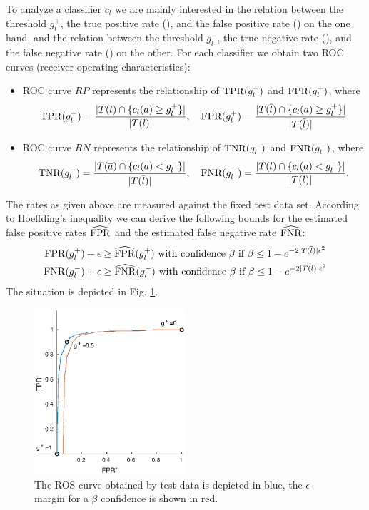 To analyze a classifier $c_l$ we are mainly interested in the relation between the threshold $g_l^+$, the true positive rate (\TPR), and the false positive rate (\FPR) on the one hand, and the relation between the threshold $g_l^-$, 
the true negative rate (\TNR), and the false negative rate (\FNR) on the other.
For each classifier we obtain two ROC curves (receiver operating characteristics):
\begin{itemize}
\item ROC curve $RP$ represents the relationship of $\mathrm{TPR}(g_l^+)$ and $\mathrm{FPR}(g_l^+)$,
where
\begin{gather*}
    \mathrm{TPR}(g_l^+) = \frac{ | T(l) \cap \{ c_l(a) \geq g_l^+ \}|}{|T(l)|},\quad
    \mathrm{FPR}(g_l^+) = \frac{ | T(\overline l) \cap \{ c_l(a) \geq g_l^+ \}|}{|T(\overline l)|}
\end{gather*}
\item ROC curve $RN$ represents the relationship of $\mathrm{TNR}(g_l^-)$ and $\mathrm{FNR}(g_l^-)$, where
\begin{gather*}
    \mathrm{TNR}(g_l^-) = \frac{ | T(\overline a) \cap \{c_l(a) < g_l^- \}|}{|T(\overline l)|},\quad
    \mathrm{FNR}(g_l^-) = \frac{ | T(l) \cap \{c_l(a) < g_l^- \}|}{|T(l)|}.
\end{gather*}
\end{itemize}
The rates as given above are measured against the fixed test data set.
According to Hoeffding's inequality we can derive the following bounds for the estimated false positive rates $\widehat{\mathrm{FPR}}$ and the estimated
false negative rate $\widehat{\mathrm{FNR}}$:
\begin{gather*}
    \mathrm{FPR}(g_l^+) + \epsilon \geq \widehat{\mathrm{FPR}}(g_l^+) \text{ with confidence $\beta$ if } \beta \leq 1 - e^{-2|T(\overline l)|\epsilon^2}\\
    \mathrm{FNR}(g_l^-) + \epsilon \geq \widehat{\mathrm{FNR}}(g_l^-) \text{ with confidence $\beta$ if } \beta \leq 1 - e^{-2|T(l)|\epsilon^2}
\end{gather*}
The situation is depicted in Fig. \ref{fig:ros}.
\begin{figure}
    \centering
    \includegraphics[width=0.5\textwidth]{ros}
    \caption{The ROS curve obtained by test data is depicted in blue, the $\epsilon$-margin for a $\beta$ confidence is shown in red.}
    \label{fig:ros}
\end{figure}

